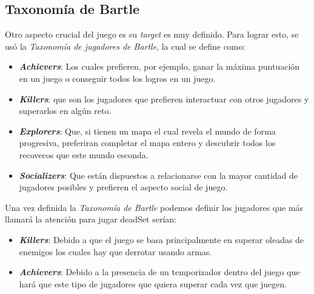 \documentclass[12pt]{article}
\begin{document}
        \subsection{Taxonomía de Bartle}
            Otro aspecto crucial del juego es su \textit{target} es muy definido. Para lograr esto, se usó la \textit{Taxonomía de jugadores de Bartle}, la cual se define como: 
                \begin{itemize}
                    \item \textit{\textbf{Achievers}}: Los cuales prefieren, por ejemplo,  ganar la máxima puntuación en un juego o conseguir todos los logros en un juego. 
                    \item \textit{\textbf{Killers}}: que son los jugadores que prefieren interactuar con otros jugadores y superarlos en algún reto.
                    \item \textit{\textbf{Explorers}}: Que, si tienen un mapa el cual revela el mundo de forma progresiva, preferiran completar el mapa entero y descubrir todos los recovecos que este mundo esconda.
                    \item \textit{\textbf{Socializers}}: Que están dispuestos a relacionarse con la mayor cantidad de jugadores posibles y prefieren el aspecto social de juego. 
                \end{itemize}
    
            \vspace{5mm}
    
            Una vez definida la \textit{Taxonomía de Bartle} podemos definir los jugadores que más llamará la atención para jugar \textunderscore deadSet serían: 
                \begin{itemize}
                    \item \textit{\textbf{Killers}}: Debido a que el juego se basa principalmente en superar oleadas de enemigos los cuales hay que derrotar usando armas.
                    \item \textit{\textbf{Achievers}}: Debido a la presencia de un temporizador dentro del juego que hará que este tipo de jugadores que quiera superar cada vez que juegen.
                \end{itemize}

\end{document}
